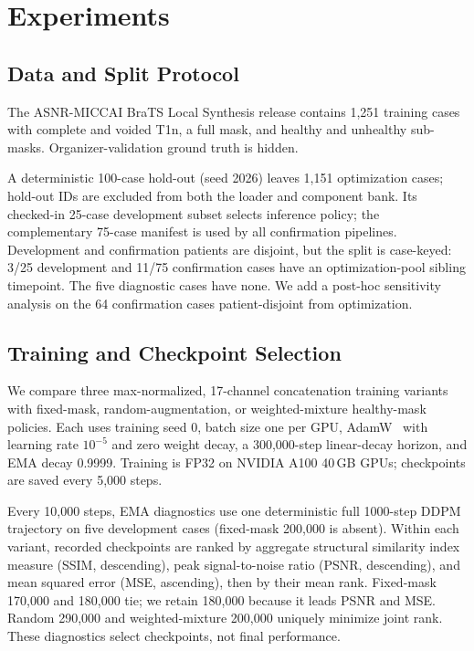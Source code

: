 \section{Experiments}
\label{sec:experiments}

\subsection{Data and Split Protocol}
\label{sec:exp:data}

The ASNR-MICCAI BraTS Local Synthesis release
\cite{kofler2023inpainting,menze2015brats,bakas2017advancing,baid2021rsna,akbari2017segmentation}
contains 1,251 training cases with complete and voided T1n, a full mask, and healthy
and unhealthy sub-masks. Organizer-validation ground truth is hidden.

A deterministic 100-case hold-out (seed 2026) leaves 1,151 optimization cases;
hold-out IDs are excluded from both the loader and component bank. Its checked-in
25-case development subset selects inference policy; the complementary 75-case
manifest is used by all confirmation pipelines. Development and confirmation
patients are disjoint, but the split is case-keyed: 3/25 development and 11/75
confirmation cases have an optimization-pool sibling timepoint. The five diagnostic
cases have none. We add a post-hoc sensitivity analysis on the 64 confirmation
cases patient-disjoint from optimization.

\subsection{Training and Checkpoint Selection}
\label{sec:exp:training}

We compare three max-normalized, 17-channel concatenation training variants with
fixed-mask, random-augmentation, or weighted-mixture healthy-mask policies. Each
uses training seed 0, batch size one per GPU,
AdamW~\cite{loshchilov2019adamw} with learning rate $10^{-5}$ and zero weight decay,
a 300,000-step linear-decay horizon, and EMA decay 0.9999. Training is FP32 on
NVIDIA A100 40\,GB GPUs; checkpoints are saved every 5,000 steps.

Every 10,000 steps, EMA diagnostics use one deterministic full 1000-step DDPM
trajectory on five development cases (fixed-mask 200,000 is absent). Within each
variant, recorded checkpoints are ranked by aggregate structural similarity index
measure (SSIM, descending), peak signal-to-noise ratio (PSNR, descending), and mean
squared error (MSE, ascending), then by their mean rank. Fixed-mask 170,000 and
180,000 tie; we retain 180,000 because it leads PSNR and MSE. Random 290,000 and
weighted-mixture 200,000 uniquely minimize joint rank. These diagnostics select
checkpoints, not final performance.

